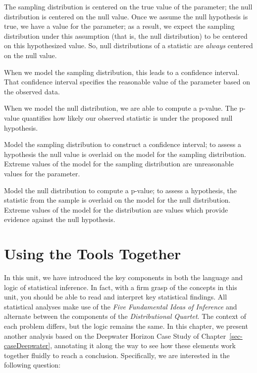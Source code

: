 \documentclass[
  letterpaper,
  DIV=11,
  numbers=noendperiod]{scrreprt}
\theoremstyle{plain}
\theoremstyle{definition}
\theoremstyle{definition}
\theoremstyle{remark}
\begin{document}
The sampling distribution is centered on the true value of the
parameter; the null distribution is centered on the null value. Once we
assume the null hypothesis is true, we have a value for the parameter;
as a result, we expect the sampling distribution under this assumption
(that is, the null distribution) to be centered on this hypothesized
value. So, null distributions of a statistic are \emph{always} centered
on the null value.

When we model the sampling distribution, this leads to a confidence
interval. That confidence interval specifies the reasonable value of the
parameter based on the observed data.

When we model the null distribution, we are able to compute a p-value.
The p-value quantifies how likely our observed statistic is under the
proposed null hypothesis.

\begin{tcolorbox}[enhanced jigsaw, breakable, titlerule=0mm, colframe=quarto-callout-tip-color-frame, bottomtitle=1mm, opacityback=0, rightrule=.15mm, toptitle=1mm, arc=.35mm, bottomrule=.15mm, left=2mm, title=\textcolor{quarto-callout-tip-color}{\faLightbulb}\hspace{0.5em}{Big Idea}, leftrule=.75mm, coltitle=black, toprule=.15mm, colbacktitle=quarto-callout-tip-color!10!white, colback=white, opacitybacktitle=0.6]

Model the sampling distribution to construct a confidence interval; to
assess a hypothesis the null value is overlaid on the model for the
sampling distribution. Extreme values of the model for the sampling
distribution are unreasonable values for the parameter.

Model the null distribution to compute a p-value; to assess a
hypothesis, the statistic from the sample is overlaid on the model for
the null distribution. Extreme values of the model for the distribution
are values which provide evidence against the null hypothesis.

\end{tcolorbox}

\chapter{Using the Tools Together}\label{sec-recaplanguage}

In this unit, we have introduced the key components in both the language
and logic of statistical inference. In fact, with a firm grasp of the
concepts in this unit, you should be able to read and interpret key
statistical findings. All statistical analyses make use of the
\emph{Five Fundamental Ideas of Inference} and alternate between the
components of the \emph{Distributional Quartet}. The context of each
problem differs, but the logic remains the same. In this chapter, we
present another analysis based on the Deepwater Horizon Case Study of
Chapter~\ref{sec-caseDeepwater}, annotating it along the way to see how
these elements work together fluidly to reach a conclusion.
Specifically, we are interested in the following question:
\end{document}
